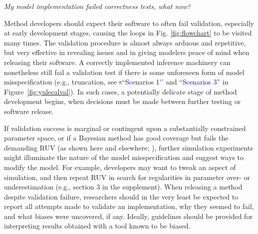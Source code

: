 \documentclass[oneside]{article}
\begin{document}
\vspace{.25cm}

\noindent \emph{My model implementation failed correctness tests, what now?}

Method developers should expect their software to often fail validation, especially at early development stages, causing the loops in Fig. \ref{fig:flowchart} to be visited many times.
The validation procedure is almost always arduous and repetitive, but very effective in revealing issues and in giving modelers peace of mind when releasing their software.
A correctly implemented inference machinery can nonetheless still fail a validation test if there is some unforeseen form of model misspecification (e.g., truncation, see \textcolor{red}{\st{s}}\textcolor{blue}{``S}cenarios 1\textcolor{blue}'' and \textcolor{blue}{``Scenarios 3''} in Figure~\ref{fig:yulecalval}).
In such cases, a potentially delicate stage of method development begins, when decisions must be made between further testing or software release.

If validation success is marginal or contingent upon a substantially constrained parameter space, or if a Bayesian method has good coverage but fails the demanding RUV (as shown here and elsewhere; \citealp{mchugh22}), further simulation experiments might illuminate the nature of the model misspecification and suggest ways to modify the model.
For example, developers may want to tweak an aspect of simulation, and then repeat RUV in search for regularities in parameter over- or underestimation (e.g., section 3 in the supplement).
When releasing a method despite validation failure, researchers should in the very least be expected to report all attempts made to validate an implementation, why they seemed to fail, and what biases were uncovered, if any.
Ideally, guidelines should be provided for interpreting results obtained with a tool known to be biased.
\end{document}

